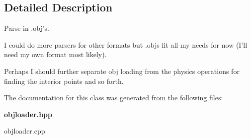 \subsection{Detailed Description}
Parse in .obj's.

I could do more parsers for other formats but .objs fit all my needs for now (I'll need my own format most likely).

Perhaps I should further separate obj loading from the physics operations for finding the interior points and so forth. 



The documentation for this class was generated from the following files:\begin{CompactItemize}
\item 
{\bf objloader.hpp}\item 
objloader.cpp\end{CompactItemize}
